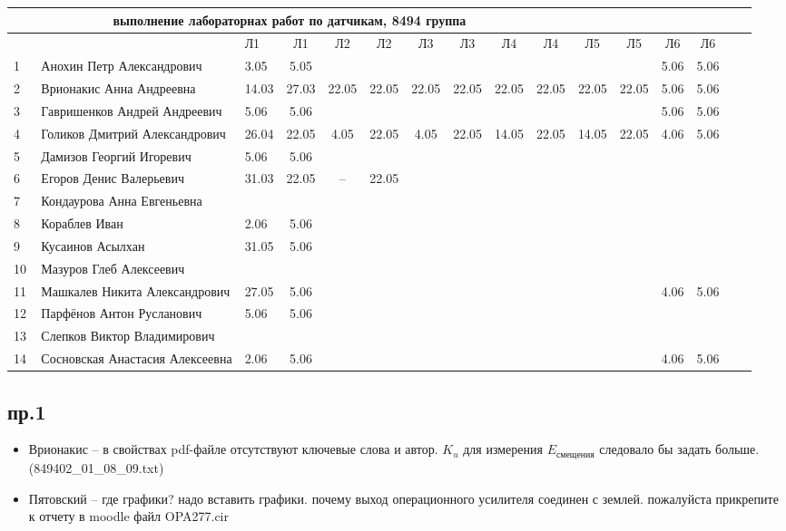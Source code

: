 \newpage
%
\begin{tabular}{l|llccccccccccccc}
\multicolumn{10}{c}{выполнение лабораторнах работ по датчикам, 8494 группа} \\
\toprule
&&Л1&Л1& Л2&Л2& Л3&Л3& Л4&Л4& Л5&Л5& Л6&Л6\\
\midrule
1\,&   Анохин Петр Александрович       &3.05& 5.05&&&&&&&&&5.06& 5.06\\
2\,&   Врионакис Анна Андреевна        &14.03&27.03&22.05&22.05&22.05&22.05&22.05&22.05& 22.05&22.05& 5.06& 5.06\\
3\,&   Гавришенков Андрей Андреевич    &5.06& 5.06&&&&&&&&& 5.06& 5.06\\
4\,&   Голиков Дмитрий Александрович   &26.04&22.05& 4.05 &22.05& 4.05 &22.05&14.05&22.05&14.05&22.05& 4.06& 5.06\\
5\,&   Дамизов Георгий Игоревич        & 5.06& 5.06&&&&&&\\
\midrule
6\,&   Егоров Денис Валерьевич         &31.03&22.05& --    & 22.05 &&&&\\
7\,&   Кондаурова Анна Евгеньевна      &&&&&&&&\\
8\,&   Кораблев Иван                   &2.06& 5.06&&&&&&\\
9\,&   Кусаинов Асылхан                &31.05& 5.06&&&&&&\\
10\,&  Мазуров Глеб Алексеевич         &&&&&&&&\\
\midrule
11\,&  Машкалев Никита Александрович   &27.05& 5.06&&&&&&&&& 4.06& 5.06\\
12\,&  Парфёнов Антон Русланович       &5.06 & 5.06&&&&&&\\
13\,&  Слепков Виктор Владимирович     &&&&&&&&\\
	14\,&  Сосновская Анастасия Алексеевна & 2.06& 5.06&&&&&&&&& 4.06 & 5.06\\
\bottomrule
\end{tabular}

\subsection*{пр.1}
\begin{itemize}
	\item Врионакис -- в свойствах pdf-файле отсутствуют ключевые слова и автор. $K_u$ для измерения $E_\text{смещения}$ следовало бы задать больше. (849402\_01\_08\_09.txt)
	\item Пятовский --
		где графики? надо вставить графики.
почему выход операционного усилителя соединен с землей.
пожалуйста прикрепите к отчету в moodle файл   OPA277.cir
\end{itemize}

